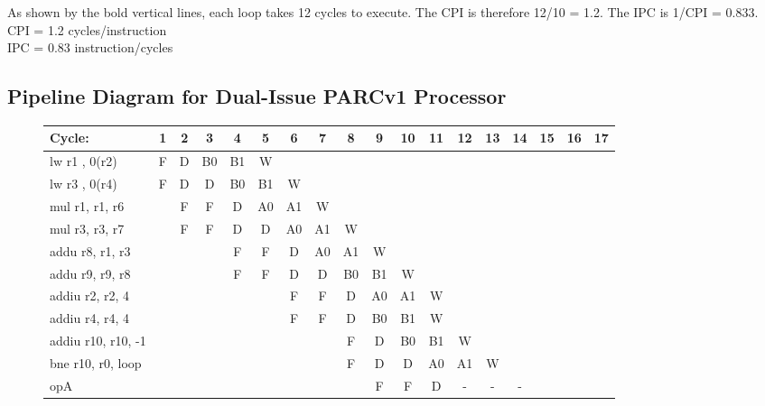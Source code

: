 \documentclass[10pt]{article}
\begin{document}
As shown by the bold vertical lines, each loop takes 12 cycles to execute. The CPI is therefore 12/10 = 1.2. The IPC is 1/CPI = 0.833.\\
CPI = 1.2 cycles/instruction\\
IPC = 0.83 instruction/cycles\\

\subsection{Pipeline Diagram for Dual-Issue PARCv1 Processor}

\begin{figure}[H]
\centering
{\setlength{\tabcolsep}{2pt}
\begin{tabular}{|l|c|c|c|c!{\vrule width 1.5pt}c|c|c|c|c|c|c|c|c|c|c!{\vrule width 1.5pt}c|c|}
\hline
Cycle:            & 1  & 2  & 3  & 4  & 5  & 6  & 7  & 8  & 9  & 10 & 11 & 12 & 13 & 14 & 15 & 16 & 17 \\ \hline
lw r1 , 0(r2)     & F  & D  & B0 & B1 & W  &    &    &    &    &    &    &    &    &    &    &    &    \\ \hline
lw r3 , 0(r4)     & F  & D  & D  & B0 & B1 & W  &    &    &    &    &    &    &    &    &    &    &    \\ \hline
mul r1, r1, r6    &    & F  & F  & D  & A0 & A1 & W  &    &    &    &    &    &    &    &    &    &    \\ \hline
mul r3, r3, r7    &    & F  & F  & D  & D  & A0 & A1 & W  &    &    &    &    &    &    &    &    &    \\ \hline
addu r8, r1, r3   &    &    &    & F  & F  & D  & A0 & A1 & W  &    &    &    &    &    &    &    &    \\ \hline
addu r9, r9, r8   &    &    &    & F  & F  & D  & D  & B0 & B1 & W  &    &    &    &    &    &    &    \\ \hline
addiu r2, r2, 4   &    &    &    &    &    & F  & F  & D  & A0 & A1 & W  &    &    &    &    &    &    \\ \hline
addiu r4, r4, 4   &    &    &    &    &    & F  & F  & D  & B0 & B1 & W  &    &    &    &    &    &    \\ \hline
addiu r10, r10, -1&    &    &    &    &    &    &    & F  & D  & B0 & B1 & W  &    &    &    &    &    \\ \hline
bne r10, r0, loop &    &    &    &    &    &    &    & F  & D  & D  & A0 & A1 & W  &    &    &    &    \\ \hline
opA               &    &    &    &    &    &    &    &    & F  & F  & D  & -  & -  & -  &    &    &    \\ \hline

\end{tabular}}
\end{figure}
\end{document}

